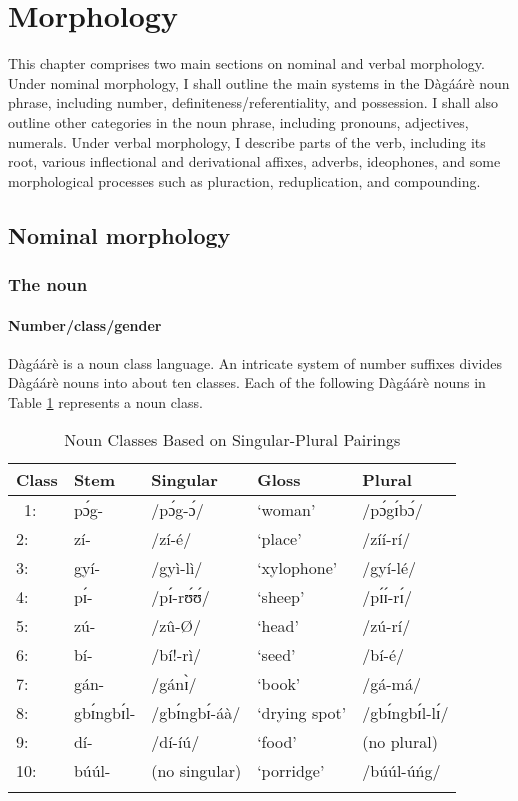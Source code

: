 \section{Morphology}

This chapter comprises two main sections on nominal and verbal morphology. Under
nominal morphology, I shall outline the main systems in the Dàgáárè noun phrase, including
number, definiteness/referentiality, and possession. I shall also outline other categories in the
noun phrase, including pronouns, adjectives, numerals. Under verbal morphology, I describe
parts of the verb, including its root, various inflectional and derivational affixes, adverbs,
ideophones, and some morphological processes such as pluraction, reduplication, and
compounding.

\subsection{Nominal morphology}
\subsubsection{ The noun}
\paragraph{Number/class/gender}

Dàgáárè is a noun class language. An intricate system of number suffixes divides Dàgáárè nouns into about ten classes. Each of the following Dàgáárè nouns in  Table  \ref{tab:classstems}
represents a noun class.
\begin{table}
    
    \begin{tabular}{lllll}\lsptoprule
Class & Stem & Singular & Gloss &Plural\\\midrule
   \ 1: & pɔ́g-& /pɔ́g-ɔ́/& ‘woman’& /pɔ́gɪ́bɔ́/  \\
2: &zí- &/zí-é/ &‘place’&/zíí-rí/ \\
3:& gyí-& /gyì-lì/& ‘xylophone’& /gyí-lé/\\
4: &pɪ́-& /pɪ́-rʊ́ʊ́/& ‘sheep’& /pɪ́ɪ́-rɪ́/\\
5: &zú-& /zû-Ø/& ‘head’ &/zú-rí/\\
6: &bí-& /bí!-rì/ &‘seed’ &/bí-é/\\
7: &gán- &/gánɪ̀/ &‘book’ &/gá-má/\\
8: &gbɪ́ngbɪ́l-& /gbɪ́ngbɪ́-áà/& ‘drying spot’& /gbɪ́ngbɪ́l-lɪ́/\\
9: &dí-& /dí-íú/& ‘food’& (no plural)\\
10: & búúl- &(no singular) &‘porridge’& /búúl-úńg/\\\lspbottomrule
    \end{tabular}
    \caption{Noun Classes Based on Singular-Plural Pairings}
    \label{tab:classstems}
\end{table}

